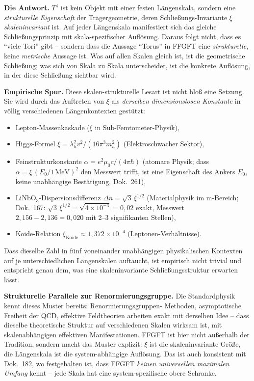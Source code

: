\textbf{Die Antwort.} $T^4$ ist kein Objekt mit einer festen
Längenskala, sondern eine \emph{strukturelle Eigenschaft} der
Trägergeometrie, deren Schließungs-Invariante $\xi$
\emph{skaleninvariant} ist. Auf jeder Längenskala manifestiert sich
das gleiche Schließungsprinzip mit skala-spezifischer Auflösung.
Daraus folgt nicht, dass es \enquote{viele Tori} gibt -- sondern
dass die Aussage \enquote{Torus} in FFGFT eine \emph{strukturelle},
keine \emph{metrische} Aussage ist. Was auf allen Skalen gleich ist,
ist die geometrische Schließung; was sich von Skala zu Skala
unterscheidet, ist die konkrete Auflösung, in der diese Schließung
sichtbar wird.

\textbf{Empirische Spur.} Diese skalen-strukturelle Lesart ist nicht
bloß eine Setzung. Sie wird durch das Auftreten von $\xi$ als
\emph{derselben dimensionslosen Konstante} in völlig verschiedenen
Längenkontexten gestützt:

\begin{itemize}[leftmargin=2em,itemsep=2pt,topsep=2pt]
  \item Lepton-Massenkaskade ($\xi$ in Sub-Femtometer-Physik),
  \item Higgs-Formel $\xi = \lambda_h^2 v^2 / (16\pi^3 m_h^2)$
        (Elektroschwacher Sektor),
  \item Feinstrukturkonstante $\alpha = e^2 \mu_0 c / (4\pi\hbar)$
        (atomare Physik; dass $\alpha=\xi\,(E_0/1\,\mathrm{MeV})^2$ den
        Messwert trifft, ist eine Eigenschaft des Ankers $E_0$, keine
        unabhängige Bestätigung, Dok.~261),
  \item $\mathrm{LiNbO}_3$-Dispersionsdifferenz
        $\Delta n = \sqrt{3}\,\xi^{1/2}$ (Materialphysik im
        \textmu m-Bereich; Dok.~167: $\sqrt{3}\,\xi^{1/2}=\sqrt{4\times10^{-4}}=0{,}02$ exakt,
        Messwert $2{,}156-2{,}136=0{,}020$ mit 2--3 signifikanten Stellen),
  \item Koide-Relation $\xi_{\text{Koide}} \approx 1{,}372 \times
        10^{-4}$ (Leptonen-Verhältnisse).
\end{itemize}

Dass dieselbe Zahl in fünf voneinander unabhängigen physikalischen
Kontexten auf je unterschiedlichen Längenskalen auftaucht, ist
empirisch nicht trivial und entspricht genau dem, was eine
skaleninvariante Schließungsstruktur erwarten lässt.

\textbf{Strukturelle Parallele zur Renormierungsgruppe.} Die
Standardphysik kennt dieses Muster bereits: Renormierungsgruppen-
Methoden, asymptotische Freiheit der QCD, effektive Feldtheorien
arbeiten exakt mit derselben Idee -- dass dieselbe theoretische
Struktur auf verschiedenen Skalen wirksam ist, mit skalenabhängigen
effektiven Manifestationen. FFGFT ist hier nicht außerhalb der
Tradition, sondern macht das Muster explizit: $\xi$ ist die
skaleninvariante Größe, die Längenskala ist die system-abhängige
Auflösung. Das ist auch konsistent mit Dok.~182, wo festgehalten
ist, dass FFGFT \emph{keinen universellen maximalen Umfang} kennt --
jede Skala hat eine system-spezifische obere Schranke.

